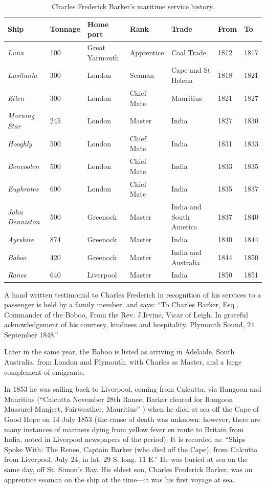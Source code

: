 \begin{table}
\begin{tabular}{lllllll}
\toprule
Ship & Tonnage & Home port & Rank & Trade & From & To \\
\midrule
\emph{Luna}           & 100 & Great Yarmouth & Apprentice & Coal Trade & 1812 & 1817 \\
\emph{Lusitania}      & 300 & London         & Seaman     & Cape and St Helena & 1818 & 1821 \\
\emph{Ellen}          & 300 & London         & Chief Mate & Mauritius & 1821 & 1827 \\
\emph{Morning Star}   & 245 & London         & Master     & India & 1827 & 1830 \\
\emph{Hooghly}        & 500 & London         & Chief Mate & India & 1831 & 1833 \\
\emph{Bencoolen}      & 500 & London         & Chief Mate & India & 1833 & 1835 \\
\emph{Euphrates}      & 600 & London         & Chief Mate & India & 1835 & 1837 \\
\emph{John Denniston} & 500 & Greenock       & Master     & India and South America & 1837 & 1840 \\
\emph{Ayrshire}       & 874 & Greenock       & Master     & India & 1840 & 1844 \\
\emph{Baboo}          & 420 & Greenock       & Master     & India and Australia & 1844 & 1850 \\
\emph{Ranee}          & 640 & Liverpool      & Master     & India & 1850 & 1851 \\
\bottomrule
\end{tabular}
\label{tab:cfb}
\caption{Charles Frederick Barker's maritime service history.\cite{CFBShipList}}
\end{table}

A hand written testimonial to Charles Frederick in recognition of his services to a passenger is held by a family member, and says:
``To Charles Barker, Esq., Commander of the Boboo,
From the Rev. J.Irvine, Vicar of Leigh.
In grateful acknowledgement of his courtesy, kindness and hospitality.
Plymouth Sound, 24 September 1848.''

Later in the same year, the Baboo is listed as arriving in Adelaide, South Australia, from London and Plymouth, with Charles as Master, and a large complement of emigrants.\cite{CFBBaboo}

In 1853 he was sailing back to Liverpool, coming from Calcutta, via Rangoon and Mauritius (``Calcutta November 28th Ranee, Barker cleared for Rangoon Mussurel Munjeet, Fairweather, Mauritius'' \cite{CFBRanee}) when he died at sea off the Cape of Good Hope on 14 July 1853 (the cause of death was unknown: however, there are many instances of mariners dying from yellow fever en route to Britain from India, noted in Liverpool newspapers of the period). It is recorded as:
``Ships Spoke With: The Renee, Captain Barker (who died off the Cape), from Calcutta from Liverpool, July 24, in lat. 29 S, long. 11 E.'' \cite{CFBDeath}
He was buried at sea on the same day, off St. Simon's Bay. His eldest son, Charles Frederick Barker, was an apprentice seaman on the ship at the time---it was his first voyage at sea.

